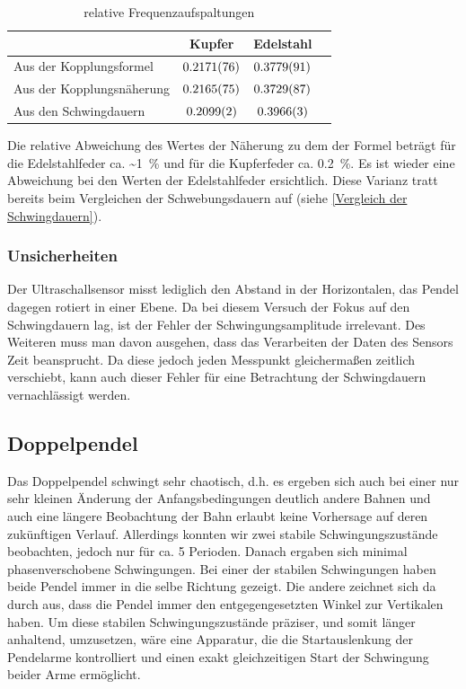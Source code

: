 \documentclass[
	a4paper,
	12pt,
	pagesize,
	ngerman
]{scrartcl}
\begin{document}
	\begin{table}[H]
	\centering
	\begin{tabular}{ l | c | c | c |}
		& Kupfer & Edelstahl  \\ \hline
		Aus der Kopplungsformel   &$\SI{0,2171 \pm 0,0076}{}$&$\SI{0,3779 \pm 0,0091}{}$\\  \hline
		Aus der Kopplungsnäherung   &$\SI{0,2165 \pm 0,0075}{}$&$\SI{0,3729 \pm 0,0087}{}$\\  \hline
		Aus den Schwingdauern   &$\SI{0,2099 \pm 0,0002}{}$&$\SI{0,3966 \pm 0,0003}{}$\\  \hline
	\end{tabular}
	\caption{relative Frequenzaufspaltungen}
	\end{table}
	\noindent{}Die relative Abweichung des Wertes der Näherung zu dem der Formel beträgt für die Edelstahlfeder ca. \SI{~1}{\%} und für die Kupferfeder ca. \SI{0,2}{\%}.
	Es ist wieder eine Abweichung bei den Werten der Edelstahlfeder ersichtlich. Diese Varianz tratt bereits beim Vergleichen der Schwebungsdauern auf (siehe \cref{Vergleich der Schwingdauern}).


	
	\subsubsection*{Unsicherheiten}
	Der Ultraschallsensor misst lediglich den Abstand in der Horizontalen, das Pendel dagegen rotiert in einer Ebene. Da bei diesem Versuch der Fokus auf den Schwingdauern lag, ist der Fehler der Schwingungsamplitude irrelevant. Des Weiteren muss man davon ausgehen, dass das Verarbeiten der Daten des Sensors Zeit beansprucht. Da diese jedoch jeden Messpunkt gleichermaßen zeitlich verschiebt, kann auch dieser Fehler für eine Betrachtung der Schwingdauern vernachlässigt werden.
	
	


	\subsection{Doppelpendel}
	Das Doppelpendel schwingt sehr chaotisch, d.h. es ergeben sich auch bei einer nur sehr kleinen Änderung der Anfangsbedingungen deutlich andere Bahnen und auch eine längere Beobachtung der Bahn erlaubt keine Vorhersage auf deren zukünftigen Verlauf. Allerdings konnten wir zwei stabile Schwingungszustände beobachten, jedoch nur für ca. 5 Perioden. Danach ergaben sich minimal phasenverschobene Schwingungen. Bei einer der stabilen Schwingungen haben beide Pendel immer in die selbe Richtung gezeigt. Die andere zeichnet sich da durch aus, dass die Pendel immer den entgegengesetzten Winkel zur Vertikalen haben. Um diese stabilen Schwingungszustände präziser, und somit länger anhaltend, umzusetzen, wäre eine Apparatur, die die Startauslenkung der Pendelarme kontrolliert und einen exakt gleichzeitigen Start der Schwingung beider Arme ermöglicht.%
\end{document}
